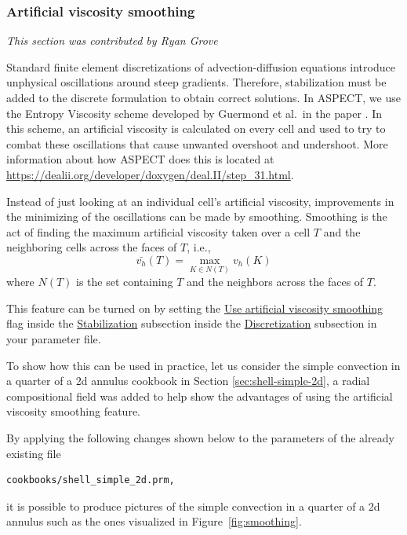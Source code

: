 \documentclass{article}
\newcommand{\aspect}{\textsc{ASPECT}}
\begin{document}
\subsubsection{Artificial viscosity smoothing}
\label{sec:artificial-viscosity-smoothing}
\textit{This section was contributed by Ryan Grove}

Standard finite element discretizations of advection-diffusion equations introduce unphysical oscillations around steep gradients. Therefore, stabilization must be added to the discrete formulation to obtain correct solutions. In ASPECT, we use the Entropy Viscosity scheme developed by Guermond et al.~in the paper \cite{guer11}. In this scheme, an artificial viscosity is calculated on every cell and used to try to combat these oscillations that cause unwanted overshoot and undershoot.  More information about how \aspect{} does this is located at \url{https://dealii.org/developer/doxygen/deal.II/step_31.html}.  

Instead of just looking at an individual cell's artificial viscosity, improvements in the minimizing of the oscillations can be made by smoothing.  Smoothing is the act of finding the maximum artificial viscosity taken over a cell $T$ and the neighboring cells across the faces of $T$, i.e.,
\begin{equation*}
\bar{v_h}(T) = \max_{K \in N(T)} v_h(K)
\end{equation*}
where $N(T)$ is the set containing $T$ and the neighbors across the faces of $T$.

This feature can be turned on by setting the \hyperref[parameters:Discretization/Stabilization parameters/Use artificial viscosity smoothing]{Use artificial viscosity smoothing} flag inside the \hyperref[parameters:Discretization/Stabilization_20parameters]{Stabilization} subsection inside the \hyperref[parameters:Discretization]{Discretization} subsection in your parameter file.

To show how this can be used in practice, let us consider the simple convection in a quarter of a 2d annulus cookbook in Section \ref{sec:shell-simple-2d}, a radial compositional field was added to help show the advantages of using the artificial viscosity smoothing feature.
  
By applying the following changes shown below to the parameters of the already existing file \begin{verbatim}cookbooks/shell_simple_2d.prm, \end{verbatim} 

it is possible to produce pictures of the simple convection in a quarter of a 2d annulus such as the ones visualized in
Figure~\ref{fig:smoothing}.
\end{document}
